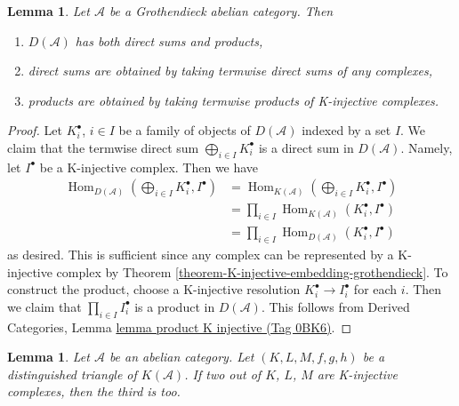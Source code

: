 \documentclass{amsart}
\theoremstyle{plain}
\newtheorem{lemma}[subsection]{Lemma}
\theoremstyle{definition}
\theoremstyle{remark}
\numberwithin{equation}{subsection}
\def\Hom{\mathop{\mathrm{Hom}}\nolimits}
\begin{document}
\begin{lemma}
\label{lemma-derived-products}
Let $\mathcal{A}$ be a Grothendieck abelian category.
Then
\begin{enumerate}
\item $D(\mathcal{A})$ has both direct sums and products,
\item direct sums are obtained by taking termwise direct sums of
any complexes,
\item products are obtained by taking termwise products of
K-injective complexes.
\end{enumerate}
\end{lemma}

\begin{proof}
Let $K^\bullet_i$, $i \in I$ be a family of objects of $D(\mathcal{A})$
indexed by a set $I$. We claim that the termwise direct sum
$\bigoplus_{i \in I} K^\bullet_i$ is a direct sum in $D(\mathcal{A})$.
Namely, let $I^\bullet$ be a K-injective complex. Then we have
\begin{align*}
\Hom_{D(\mathcal{A})}(\bigoplus\nolimits_{i \in I} K^\bullet_i, I^\bullet)
& =
\Hom_{K(\mathcal{A})}(\bigoplus\nolimits_{i \in I} K^\bullet_i, I^\bullet) \\
& =
\prod\nolimits_{i \in I} \Hom_{K(\mathcal{A})}(K^\bullet_i, I^\bullet) \\
& =
\prod\nolimits_{i \in I} \Hom_{D(\mathcal{A})}(K^\bullet_i, I^\bullet)
\end{align*}
as desired. This is sufficient since any complex can be represented
by a K-injective complex by
Theorem \ref{theorem-K-injective-embedding-grothendieck}.
To construct the product, choose a K-injective resolution
$K_i^\bullet \to I_i^\bullet$ for each $i$. Then we claim that
$\prod_{i \in I} I_i^\bullet$ is a product in $D(\mathcal{A})$.
This follows from
Derived Categories, Lemma \href{https://stacks.math.columbia.edu/tag/0BK6}{lemma product K injective (Tag 0BK6)}.
\end{proof}


\begin{lemma}
\label{derived-lemma-triangle-K-injective}
Let $\mathcal{A}$ be an abelian category. Let $(K, L, M, f, g, h)$
be a distinguished triangle of $K(\mathcal{A})$. If two out of
$K$, $L$, $M$ are K-injective complexes, then the third is too.
\end{lemma}
\end{document}
